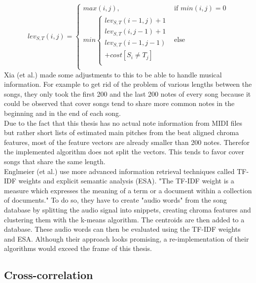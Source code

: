 \begin{equation} \label{eq:tr1}
lev_{S,T}(i, j) = \begin{cases}
max(i, j), &\text{if } min(i, j) = 0\\
min \begin{cases}
lev_{S,T}(i-1, j) + 1\\
lev_{S,T}(i, j-1) + 1\\
lev_{S,T}(i-1, j-1)\\
+cost[S_i \neq T_j]\\
\end{cases} &\text{else} \\
\end{cases}
\end{equation}
Xia (et al.) made some adjustments to this to be able to handle musical information.\cite[pp. 7ff]{chroma4} For example to get rid of the problem of various lengths between the songs, they only took the first 200 and the last 200 notes of every song because it could be observed that cover songs tend to share more common notes in the beginning and in the end of each song.\\
Due to the fact that this thesis has no actual note information from MIDI files but rather short lists of estimated main pitches from the beat aligned chroma features, most of the feature vectors are already smaller than 200 notes. Therefor the implemented algorithm does not split the vectors. This tends to favor cover songs that share the same length. 
\ \\
Englmeier  (et al.) use more advanced information retrieval techniques called TF-IDF weights and explicit semantic analysis (ESA). "The TF-IDF weight is a measure which expresses the meaning of a term or a document within a collection of documents." \cite[p. 186]{chroma1}
To do so, they have to create "audio words" from the song database by splitting the audio signal into snippets, creating chroma features and clustering them with the k-means algorithm. The centroids are then added to a database. These audio words can then be evaluated using the TF-IDF weights and ESA.
Although their approach looks promising, a re-implementation of their algorithms would exceed the frame of this thesis.

\subsection{Cross-correlation}

